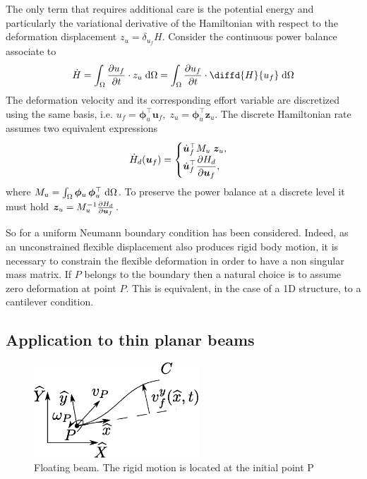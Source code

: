 The only term that requires additional care is the potential energy and particularly the variational derivative of the Hamiltonian with respect to the deformation displacement $z_{u}=\delta_{u_f} H$.  Consider the continuous power balance associate to
\[
\dot{H} = \int_{\Omega} \diffp{u_f}{t} \cdot z_{u} \d{\Omega} = \int_{\Omega} \diffp{u_f}{t} \cdot \diffd{H}{u_f} \d{\Omega}
\]
The deformation velocity and its corresponding effort variable are discretized using the same basis, i.e. $u_f = \bm{\phi}_u^\top \bm{u}_f, \; z_u = \bm{\phi}_u^\top \bm{z}_u$. The discrete Hamiltonian rate assumes two equivalent expressions
\begin{equation*}
\dot{H}_d(\bm{u}_f) = 
\begin{cases}
\dot{\bm{u}}_f^\top {M}_u \; \bm{z}_u, \\
\displaystyle \dot{\bm{u}}_f^\top \diffp{H_d}{\bm{u}_f},
\end{cases}
\end{equation*}
where ${M}_u=\int_{\Omega} \bm{\phi}_u \, \bm{\phi}_u^\top \d{\Omega}$. To preserve the power balance at a discrete level it must hold $ \bm{z}_u = {M}_u^{-1} \diffp{H_d}{\bm{u}_f}$. \\

\begin{remark}\label{rmk:def_P}
So for a uniform Neumann boundary condition has been considered. Indeed, as an unconstrained flexible displacement also produces rigid body motion, it is necessary to constrain the flexible deformation in order to have a non singular mass matrix. If $P$ belongs to the boundary then
a natural choice is to assume zero deformation at point $P$. This is equivalent, in the case of a 1D structure, to a cantilever condition. 
\end{remark}

\subsection{Application to thin planar beams}
\label{sec:ph_floatbeam}

\begin{figure}[t]
	\centering
	\includegraphics[width=0.55\textwidth]{beam.eps} 
	\caption{Floating beam. The rigid motion is located at the initial point P}
	\label{fig:beam}
\end{figure}


